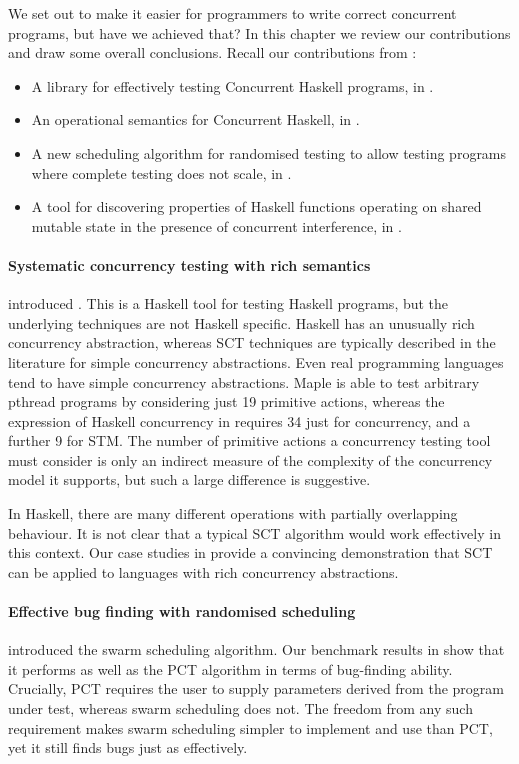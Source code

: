 We set out to make it easier for programmers to write correct
concurrent programs, but have we achieved that?  In this chapter we
review our contributions and draw some overall conclusions.  Recall
our contributions from :

\begin{itemize}
\item A library for effectively testing Concurrent Haskell programs,
  in .
\item An operational semantics for Concurrent Haskell, in
  .
\item A new scheduling algorithm for randomised testing to allow
  testing programs where complete testing does not scale, in
  .
\item A tool for discovering properties of Haskell functions operating
  on shared mutable state in the presence of concurrent interference,
  in .
\end{itemize}

\paragraph{Systematic concurrency testing with rich semantics}
 introduced \dejafu{}.  This is a Haskell tool for
testing Haskell programs, but the underlying techniques are not
Haskell specific.  Haskell has an unusually rich concurrency
abstraction, whereas SCT techniques are typically described in the
literature for simple concurrency abstractions.  Even real programming
languages tend to have simple concurrency abstractions.
Maple \parencite{yu2012} is able to test arbitrary pthread programs by
considering just 19 primitive actions, whereas the expression of
Haskell concurrency in \dejafu{} requires 34 just for concurrency, and
a further 9 for STM.  The number of primitive actions a concurrency
testing tool must consider is only an indirect measure of the
complexity of the concurrency model it supports, but such a large
difference is suggestive.

In Haskell, there are many different operations with partially
overlapping behaviour.  It is not clear that a typical SCT algorithm
would work effectively in this context.  Our case studies in
 provide a convincing demonstration that
SCT can be applied to languages with rich concurrency abstractions.

\paragraph{Effective bug finding with randomised scheduling}
 introduced the swarm scheduling algorithm.  Our
benchmark results in  show that it performs
as well as the PCT algorithm \parencite{burckhardt2010} in terms of
bug-finding ability.  Crucially, PCT requires the user to supply
parameters derived from the program under test, whereas swarm
scheduling does not.  The freedom from any such requirement makes
swarm scheduling simpler to implement and use than PCT, yet it still
finds bugs just as effectively.

